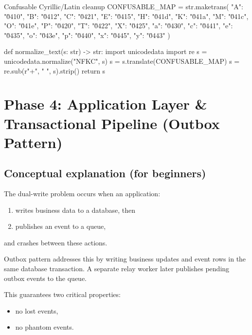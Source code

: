 \documentclass[11pt,a4paper]{article}
\begin{document}
\begin{codeblock}[language=Python]{Confusable Cyrillic/Latin cleanup}
CONFUSABLE_MAP = str.maketrans({
    "A": "\u0410", "B": "\u0412", "C": "\u0421", "E": "\u0415", "H": "\u041d", "K": "\u041a",
    "M": "\u041c", "O": "\u041e", "P": "\u0420", "T": "\u0422", "X": "\u0425",
    "a": "\u0430", "c": "\u0441", "e": "\u0435", "o": "\u043e", "p": "\u0440", "x": "\u0445", "y": "\u0443"
})

def normalize_text(s: str) -> str:
    import unicodedata
    import re
    s = unicodedata.normalize("NFKC", s)
    s = s.translate(CONFUSABLE_MAP)
    s = re.sub(r"\s+", " ", s).strip()
    return s
\end{codeblock}

\section{Phase 4: Application Layer \& Transactional Pipeline (Outbox Pattern)}

\subsection{Conceptual explanation (for beginners)}
\begin{conceptbox}
The dual-write problem occurs when an application:
\begin{enumerate}[leftmargin=1.5em]
  \item writes business data to a database, then
  \item publishes an event to a queue,
\end{enumerate}
and crashes between these actions.

Outbox pattern addresses this by writing business updates and event rows in the same database transaction. A separate relay worker later publishes pending outbox events to the queue.

This guarantees two critical properties:
\begin{itemize}[leftmargin=1.4em]
  \item no lost events,
  \item no phantom events.
\end{itemize}
\end{conceptbox}
\end{document}
